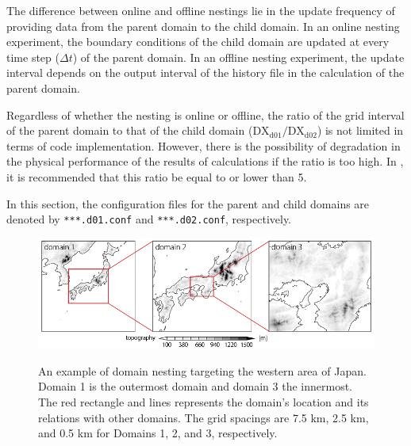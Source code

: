 The difference between online and offline nestings lie in the update frequency of providing data from the parent domain to the child domain. In an online nesting experiment, the boundary conditions of the child domain are updated at every time step ($\Delta t$) of the parent domain. In an offline nesting experiment, the update interval depends on the output interval of the history file in the calculation of the parent domain. 

Regardless of whether the nesting is online or offline, the ratio of the grid interval of the parent domain to that of the child domain  ($\mathrm{DX}_{\mathrm{d01}}/\mathrm{DX}_{\mathrm{d02}}$) is not limited in terms of code implementation. However, there is the possibility of degradation in the physical performance of the results of calculations if the ratio is too high. In \scalerm, it is recommended that this ratio be equal to or lower than 5.

In this section, the configuration files for the parent and child domains
are denoted by \verb|***.d01.conf| and \verb|***.d02.conf|, respectively.

\begin{figure}[t]
\begin{center}
  \includegraphics[width=1.0\hsize]{./figure/nesting_sample.png}\\
  \caption{An example of domain nesting targeting the western area of Japan.
    Domain 1 is the outermost domain and domain 3 the innermost.
    The red rectangle and lines represents the domain’s location and its relations with other domains.
    The grid spacings are 7.5 km, 2.5 km, and 0.5 km for Domains 1, 2, and 3, respectively.
  }
  \label{fig_nestsample}
\end{center}
\end{figure}




